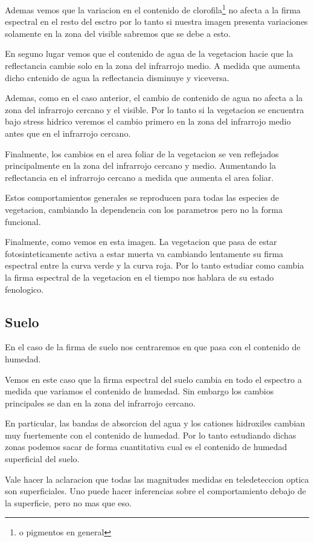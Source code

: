 Ademas vemos que la variacion en el contenido de clorofila\footnote{o pigmentos
en general} no afecta a la firma espectral en el resto del esctro por lo tanto
si nuestra imagen presenta variaciones solamente en la zona del visible sabremos
que se debe a esto.

En seguno lugar vemos que el contenido de agua de la vegetacion hacie que la
reflectancia cambie solo en la zona del infrarrojo medio. A medida que aumenta
dicho cntenido de agua la reflectancia disminuye y viceversa.

Ademas, como en el caso anterior, el cambio de contenido de agua no afecta a la
zona del infrarrojo cercano y el visible. Por lo tanto si la vegetacion se
encuentra bajo stress hidrico veremos el cambio primero en la zona del
infrarrojo medio antes que en el infrarrojo cercano.

Finalmente, los cambios en el area foliar de la vegetacion se ven reflejados
principalmente en la zona del infrarrojo cercano y medio. Aumentando la
reflectancia en el infrarrojo cercano a medida que aumenta el area foliar.

Estos comportamientos generales se reproducen para todas las especies de
vegetacion, cambiando la dependencia con los parametros pero no la forma
funcional.

Finalmente, como vemos en esta imagen. La vegetacion que pasa de estar
fotosinteticamente activa a estar muerta va cambiando lentamente su firma
espectral entre la curva verde y la curva roja. Por lo tanto estudiar como
cambia la firma espectral de la vegetacion en el tiempo nos hablara de su estado
fenologico.

\subsection{Suelo}

En el caso de la firma de suelo nos centraremos en que pasa con el contenido de
humedad.

Vemos en este caso que la firma espectral del suelo cambia en todo el espectro a
medida que variamos el contenido de humedad. Sin embargo los cambios principales
se dan en la zona del infrarrojo cercano.

En particular, las bandas de absorcion del agua y los cationes hidroxiles
cambian muy fuertemente con el contenido de humedad. Por lo tanto estudiando
dichas zonas podemos sacar de forma cuantitativa cual es el contenido de humedad
superficial del suelo.

\begin{obs}
  Vale hacer la aclaracion que todas las magnitudes medidas en teledeteccion
  optica son superficiales. Uno puede hacer inferencias sobre el comportamiento
  debajo de la superficie, pero no mas que eso.
\end{obs}

